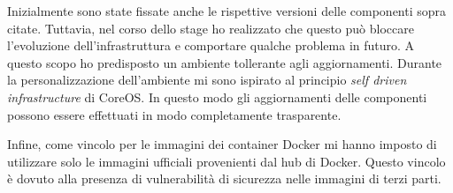 Inizialmente sono state fissate anche le rispettive versioni delle componenti sopra citate. Tuttavia, nel corso dello stage ho realizzato che questo può bloccare l'evoluzione dell'infrastruttura e comportare qualche problema in futuro. A questo scopo ho predisposto un ambiente tollerante agli aggiornamenti. Durante la personalizzazione dell'ambiente mi sono ispirato al principio  \textit{self driven infrastructure} di CoreOS. 
In questo modo gli aggiornamenti delle componenti possono essere effettuati in modo completamente trasparente.

Infine, come vincolo per le immagini dei container Docker mi hanno imposto di utilizzare solo le immagini ufficiali provenienti dal hub di Docker. Questo vincolo è dovuto alla presenza di vulnerabilità di sicurezza nelle immagini di terzi parti.